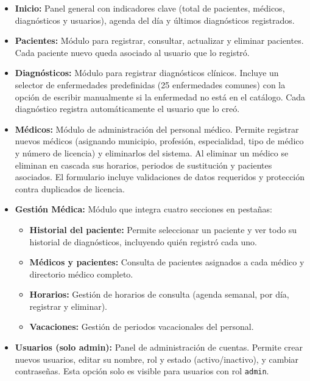 \documentclass[12pt,a4paper]{article}
\begin{document}
\begin{itemize}
    \item \textbf{Inicio:} Panel general con indicadores clave (total de pacientes, m\'edicos, diagn\'osticos y usuarios), agenda del d\'ia y \'ultimos diagn\'osticos registrados.

    \item \textbf{Pacientes:} M\'odulo para registrar, consultar, actualizar y eliminar pacientes. Cada paciente nuevo queda asociado al usuario que lo registr\'o.

    \item \textbf{Diagn\'osticos:} M\'odulo para registrar diagn\'osticos cl\'inicos. Incluye un selector de enfermedades predefinidas (25 enfermedades comunes) con la opci\'on de escribir manualmente si la enfermedad no est\'a en el cat\'alogo. Cada diagn\'ostico registra autom\'aticamente el usuario que lo cre\'o.

    \item \textbf{M\'edicos:} M\'odulo de administraci\'on del personal m\'edico. Permite registrar nuevos m\'edicos (asignando municipio, profesi\'on, especialidad, tipo de m\'edico y n\'umero de licencia) y eliminarlos del sistema. Al eliminar un m\'edico se eliminan en cascada sus horarios, periodos de sustituci\'on y pacientes asociados. El formulario incluye validaciones de datos requeridos y protecci\'on contra duplicados de licencia.

    \item \textbf{Gesti\'on M\'edica:} M\'odulo que integra cuatro secciones en pesta\~nas:
    \begin{itemize}
        \item \textbf{Historial del paciente:} Permite seleccionar un paciente y ver todo su historial de diagn\'osticos, incluyendo qui\'en registr\'o cada uno.
        \item \textbf{M\'edicos y pacientes:} Consulta de pacientes asignados a cada m\'edico y directorio m\'edico completo.
        \item \textbf{Horarios:} Gesti\'on de horarios de consulta (agenda semanal, por d\'ia, registrar y eliminar).
        \item \textbf{Vacaciones:} Gesti\'on de periodos vacacionales del personal.
    \end{itemize}

    \item \textbf{Usuarios (solo admin):} Panel de administraci\'on de cuentas. Permite crear nuevos usuarios, editar su nombre, rol y estado (activo/inactivo), y cambiar contrase\~nas. Esta opci\'on solo es visible para usuarios con rol \texttt{admin}.


\end{itemize}
\end{document}
